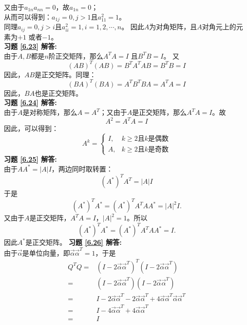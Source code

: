 \documentclass[a4paper]{book}
\begin{document}
又由于$a_{1n}a_{nn}=0$，故$a_{1n}=0$；\\
从而可以得到：$a_{1j}=0,j>1$且$a_{11}^2=1$。\\
同理$a_{ij}=0,j>i$且$a_{ii}^2=1,i=1,2,\cdots,n$。
因此$A$为对角矩阵，且$A$对角元上的元素为$+1$ 或者$-1$。\\
\textbf{习题 \ref{6.23} 解答:}\\
由于$A,B$都是$n$阶正交矩阵，那么$A^TA=I$ 且$B^TB=I$。
又
\begin{equation*}
  (AB)^T(AB)=B^TA^TAB=B^TB=I
\end{equation*}
因此，$AB$是正交矩阵。同理：
\begin{equation*}
  (BA)^T(BA)=A^TB^TBA=A^TA=I
\end{equation*}
因此，$BA$也是正交矩阵。\\
\textbf{习题 \ref{6.24} 解答:}\\
由于$A$是对称矩阵，那么$A=A^T$；又由于$A$是正交矩阵，那么$A^TA=I$。故
\begin{equation*}
A^2=A^TA=I
\end{equation*}
因此，可以得到：
\begin{equation*}
 A^{k}=\begin{cases}
  I,& k\geq2\text{且}k\text{是偶数}\\
  A,& k\geq2\text{且}k\text{是奇数}
  \end{cases}
\end{equation*}
\textbf{习题 \ref{6.25} 解答:}\\
由于$AA^*=|A|I$，两边同时取转置：
\begin{equation*}
(A^*)^TA^T=|A|I
\end{equation*}
于是
\begin{equation*}
(A^*)^TA^*=(A^*)^TA^TAA^*=|A|^2I.
\end{equation*}
又由于$A$是正交矩阵，$A^TA=I$，$|A|^2=1$。所以
\begin{equation*}
(A^*)^TA^*=(A^*)^TA^TAA^*=I.
\end{equation*}
因此$A^*$是正交矩阵。
\textbf{习题 \ref{6.26} 解答:}\\
由于$\vec{\alpha}$是单位向量，即$\vec{\alpha}\vec{\alpha}^T=1$，于是
\begin{align*}
Q^TQ=&(I-2\vec{\alpha}\vec{\alpha}^T)^T(I-2\vec{\alpha}\vec{\alpha}^T)\\
    =&(I-2\vec{\alpha}\vec{\alpha}^T)(I-2\vec{\alpha}\vec{\alpha}^T)\\
    =&I-2\vec{\alpha}\vec{\alpha}^T-2\vec{\alpha}\vec{\alpha}^T+4\vec{\alpha}\vec{\alpha}^T\vec{\alpha}\vec{\alpha}^T\\
    =&I-4\vec{\alpha}\vec{\alpha}^T+4\vec{\alpha}\vec{\alpha}^T\\
    =&I
\end{align*}
\end{document}
